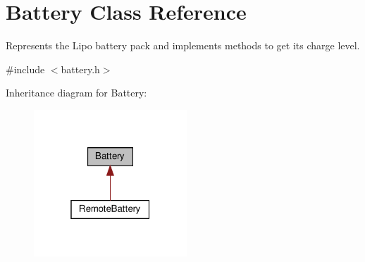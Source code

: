 \hypertarget{class_battery}{}\section{Battery Class Reference}
\label{class_battery}


Represents the Lipo battery pack and implements methods to get its charge level.  




{\ttfamily \#include $<$battery.\+h$>$}



Inheritance diagram for Battery\+:\nopagebreak
\begin{figure}[H]
\begin{center}
\leavevmode
\includegraphics[width=163pt]{class_battery__inherit__graph}
\end{center}
\end{figure}
